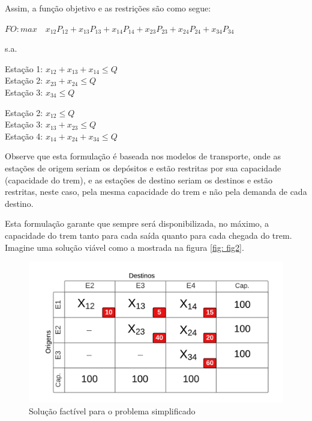 \noindent Assim, a função objetivo e as restrições são como segue:

$FO: max \quad x_{12}P_{12} + x_{13}P_{13} + x_{14}P_{14} + x_{23}P_{23} + x_{24}P_{24} + x_{34}P_{34}$

s.a.


Estação 1: $x_{12} + x_{13} + x_{14} \leq Q $ \\
\indent Estação 2: $x_{23} + x_{24}  \leq  Q $ \\
\indent Estação 3: $x_{34} \leq Q $


Estação 2: $x_{12} \leq Q $ \\
\indent Estação 3: $x_{13} + x_{23}  \leq  Q $ \\
\indent Estação 4: $x_{14} + x_{24} + x_{34} \leq Q $

Observe que esta formulação é baseada nos modelos de transporte, onde as estações de origem seriam os depósitos e estão restritas por sua capacidade (capacidade do trem), e as estações de destino seriam os destinos e estão restritas, neste caso, pela mesma capacidade do trem e não pela demanda de cada destino.

Esta formulação garante que sempre será disponibilizada, no máximo, a capacidade do trem tanto para cada saída quanto para cada chegada do trem. Imagine uma solução viável como a mostrada na figura \ref{fig: fig2}.

\begin{figure}[h]
	\begin{center}
		\includegraphics[scale=0.4]{img/fig3.png}
		\caption{Solução factível para o problema simplificado}
		\label{fig: fig3}
	\end{center}
\end{figure}

